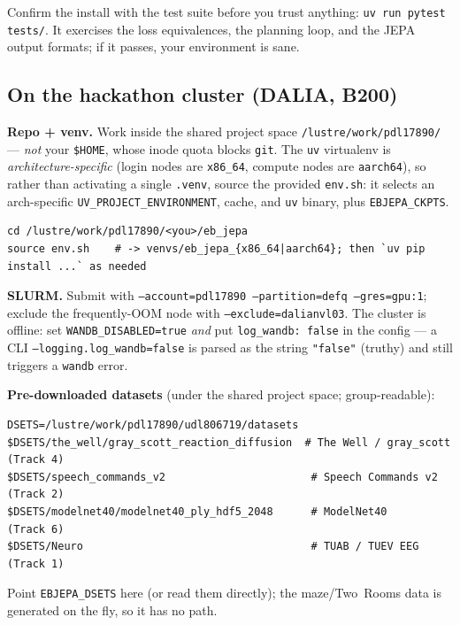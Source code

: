 \documentclass{article}
\newcommand{\code}[1]{\texttt{\small #1}}
\newcommand{\file}[1]{\texttt{\small #1}}
\begin{document}
\begin{tipbox}
Confirm the install with the test suite before you trust anything:
\code{uv run pytest tests/}. It exercises the loss equivalences, the planning
loop, and the JEPA output formats; if it passes, your environment is sane.
\end{tipbox}

\subsection{On the hackathon cluster (DALIA, B200)}
\label{sec:cluster}

\textbf{Repo + venv.} Work inside the shared project space \code{/lustre/work/pdl17890/}
--- \emph{not} your \code{\$HOME}, whose inode quota blocks \code{git}. The \code{uv}
virtualenv is \emph{architecture-specific} (login nodes are \code{x86\_64}, compute
nodes are \code{aarch64}), so rather than activating a single \code{.venv}, source the
provided \file{env.sh}: it selects an arch-specific \code{UV\_PROJECT\_ENVIRONMENT},
cache, and \code{uv} binary, plus \code{EBJEPA\_CKPTS}.
\begin{lstlisting}[style=bash]
cd /lustre/work/pdl17890/<you>/eb_jepa
source env.sh    # -> venvs/eb_jepa_{x86_64|aarch64}; then `uv pip install ...` as needed
\end{lstlisting}

\textbf{SLURM.} Submit with \code{--account=pdl17890 --partition=defq --gres=gpu:1};
exclude the frequently-OOM node with \code{--exclude=dalianvl03}. The cluster is
offline: set \code{WANDB\_DISABLED=true} \emph{and} put \code{log\_wandb: false} in
the config --- a CLI \code{--logging.log\_wandb=false} is parsed as the string
\code{"false"} (truthy) and still triggers a \code{wandb} error.

\textbf{Pre-downloaded datasets} (under the shared project space; group-readable):
\begin{lstlisting}[style=bash]
DSETS=/lustre/work/pdl17890/udl806719/datasets
$DSETS/the_well/gray_scott_reaction_diffusion  # The Well / gray_scott (Track 4)
$DSETS/speech_commands_v2                       # Speech Commands v2  (Track 2)
$DSETS/modelnet40/modelnet40_ply_hdf5_2048      # ModelNet40          (Track 6)
$DSETS/Neuro                                    # TUAB / TUEV EEG     (Track 1)
\end{lstlisting}
Point \code{EBJEPA\_DSETS} here (or read them directly); the maze/Two~Rooms data is
generated on the fly, so it has no path.
\end{document}
